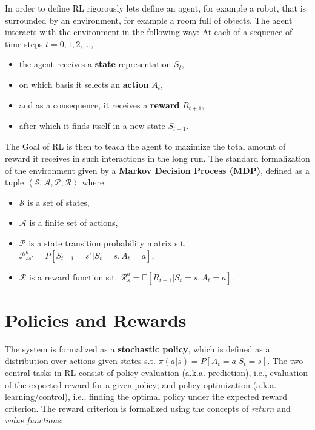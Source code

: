 In order to define RL rigorously lets define an agent, for example a robot,
that is surrounded by an environment, for example a room full of objects. The
agent interacts with the environment in the following way: At each of a
sequence of time steps $t = 0,1,2,\ldots$,

\begin{itemize}
  \item the agent receives a \textbf{state} representation $S_t$,
  \item on which basis it selects an \textbf{action} $A_t$,
  \item and as a consequence, it receives a \textbf{reward} $R_{t+1}$,
  \item after which it finds itself in a new state $S_{t+1}$.
\end{itemize}

The Goal of RL is then to teach the agent to maximize the total amount of
reward it receives in such interactions in the long run. The standard
formalization of the environment given by a \textbf{Markov Decision Process
(MDP)}, defined as a tuple $\left< \mathcal{S}, \mathcal{A}, \mathcal{P},
\mathcal{R} \right>$ where

  \begin{itemize}
  \item $\mathcal{S}$ is a set of states,
  \item $\mathcal{A}$ is a finite set of actions,
  \item $\mathcal{P}$ is a state transition probability matrix s.t. $\mathcal{P}_{ss'}^{a} = P[S_{t+1} = s' | S_t = s, A_t = a]$, 
  \item $\mathcal{R}$ is a reward function  s.t. $\mathcal{R}_s^a = \mathbb{E}[R_{t+1}| S_t = s, A_t = a]$. 
  \end{itemize}


\section{Policies and Rewards}

The system is formalized as a \textbf{stochastic policy}, which is defined as a
distribution over actions given states s.t. $\pi(a|s) = P[A_t = a| S_t = s]$.
The two central tasks in RL consist of policy evaluation (a.k.a. prediction),
i.e., evaluation of the expected reward for a given policy; and policy
optimization (a.k.a. learning/control), i.e., finding the optimal policy under
the expected reward criterion. The reward criterion is formalized using the
concepts of \emph{return} and \emph{value functions}: 

